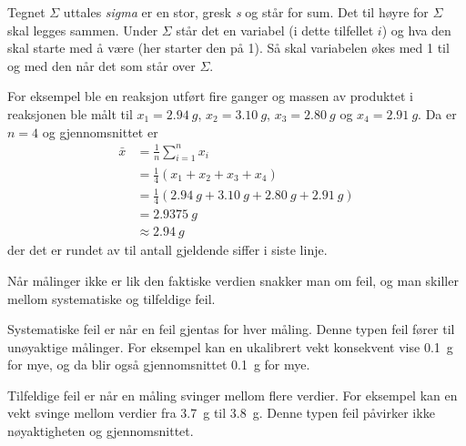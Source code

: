 	Tegnet $\Sigma$ uttales \emph{sigma} er en stor, gresk \emph{s} og står for sum. Det til høyre for $\Sigma$ skal legges sammen. Under $\Sigma$ står det en variabel (i dette tilfellet $i$) og hva den skal starte med å være (her starter den på 1). Så skal variabelen økes med 1 til og med den når det som står over $\Sigma$.
	
	For eksempel ble en reaksjon utført fire ganger og massen av produktet i reaksjonen ble målt til $x_1=\SI{2.94}{g}$, $x_2=\SI{3.10}{g}$, $x_3=\SI{2.80}{g}$ og $x_4=\SI{2.91}{g}$. Da er $n=4$ og gjennomsnittet er
	\begin{align*}
		\bar{x} &= \frac{1}{n}\sum_{i=1}^{n}x_i\\
		&=\frac{1}{4}\left(x_1 + x_2 + x_3 + x_4\right)\\
		&=\frac{1}{4}\left(\SI{2.94}{g} + \SI{3.10}{g} + \SI{2.80}{g} + \SI{2.91}{g}\right)\\
		&=\SI{2.9375}{g}\\
		&\approx\SI{2.94}{g}
	\end{align*}
	der det er rundet av til antall gjeldende siffer i siste linje.
	
	Når målinger ikke er lik den faktiske verdien snakker man om feil, og man skiller mellom systematiske og tilfeldige feil. 
	
	Systematiske feil er når en feil gjentas for hver måling. Denne typen feil fører til unøyaktige målinger. For eksempel kan en ukalibrert vekt konsekvent vise \SI{0.1}{g} for mye, og da blir også gjennomsnittet \SI{0.1}{g} for mye.
	
	Tilfeldige feil er når en måling svinger mellom flere verdier. For eksempel kan en vekt svinge mellom verdier fra \SI{3.7}{g} til \SI{3.8}{g}. Denne typen feil påvirker ikke nøyaktigheten og gjennomsnittet.
	
	\begin{comment}
		\tikzstyle{every picture}+=[remember picture]
		\everymath{\displaystyle}
		\begin{equation*}
		\bar{x}=\frac{1}{n}\sum_{
		\tikz[baseline]{
		\node[anchor=base, inner sep=0] (idx)
		{$\scriptstyle i$};
		}=
		\tikz[baseline]{
		\node[anchor=base, inner sep=0] (idxs)
		{$\scriptstyle 1$};
		}
		}^{
		\tikz[baseline]{
		\node[anchor=base, inner sep=0] (idxe)
		{$\scriptstyle n$};
		}
		}
		\tikz[baseline]{
		\node[anchor=base, inner sep=0] (ele)
		{$x_i$};
		}
		\tikz[overlay]{
		\draw [->] (idx.south) to +(0,-.5) to +(-.5,-.5) node[left] {indeksvariabel};
		\draw [->] (idxs.south) to +(0,-.5) to +(.5,-.5) node[right]{startindeks};
		\draw [->] (idxe.north) to +(0,.5) to +(.5,.5) node[right]{sluttindeks};
		\draw [->] (ele.east) to +(.5,0) node[right]{uttrykk som summeres};
		\useasboundingbox (-5,2) rectangle (6,-2);
		}
		\end{equation*}
	\end{comment}
	
